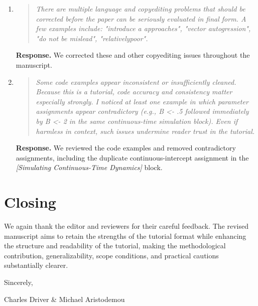 \documentclass[11pt]{article}
\newcommand{\response}{\textbf{Response.} }
\newcommand{\secit}[1]{\textit{[#1]}}
\newenvironment{reviewerpoint}{\begin{quote}\itshape}{\end{quote}}
\begin{document}
\begin{enumerate}[label=\textbf{Reviewer 2, Specific Comment \arabic*.}]

\item

\begin{reviewerpoint}
There are multiple language and copyediting problems that should be corrected before the paper can be seriously evaluated in final form.
A few examples include: "introduce a approaches", "vector autogression", "do not be mislead", "relativelypoor".
\end{reviewerpoint}

\response We corrected these and other copyediting issues throughout the manuscript.
\item

\begin{reviewerpoint}
Some code examples appear inconsistent or insufficiently cleaned.
Because this is a tutorial, code accuracy and consistency matter especially strongly.
I noticed at least one example in which parameter assignments appear contradictory (e.g., B \textless{}- .5 followed immediately by B \textless{}- 2 in the same continuous-time simulation block).
Even if harmless in context, such issues undermine reader trust in the tutorial.
\end{reviewerpoint}

\response We reviewed the code examples and removed contradictory assignments, including the duplicate continuous-intercept assignment in the \secit{Simulating Continuous-Time Dynamics} block.
\end{enumerate}

\section*{Closing}

We again thank the editor and reviewers for their careful feedback.
The revised manuscript aims to retain the strengths of the tutorial format while enhancing the structure and readability of the tutorial, making the methodological contribution, generalizability, scope conditions, and practical cautions substantially clearer.

Sincerely,

Charles Driver \& Michael Aristodemou
\end{document}

